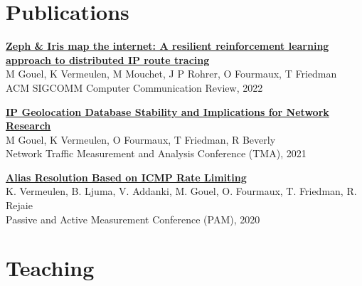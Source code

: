\documentclass[11pt,a4paper,sans]{moderncv} %
\begin{document}

\section{Publications}

\href{https://hal.archives-ouvertes.fr/hal-03597580/document}{\textbf{Zeph \& Iris map the internet: A resilient reinforcement learning approach to distributed IP route tracing}}\\
M Gouel, K Vermeulen, M Mouchet, J P Rohrer, O Fourmaux, T Friedman\\
ACM SIGCOMM Computer Communication Review, 2022

\vspace{0.25cm}
\href{https://dl.ifip.org/db/conf/tma/tma2021/tma2021-paper2.pdf}{\textbf{IP Geolocation Database Stability and Implications for Network Research}}\\
M Gouel, K Vermeulen, O Fourmaux, T Friedman, R Beverly\\
Network Traffic Measurement and Analysis Conference (TMA), 2021

\vspace{0.25cm}
\href{https://arxiv.org/pdf/2002.00252.pdf}{\textbf{Alias Resolution Based on ICMP Rate Limiting}} \\
K. Vermeulen, B. Ljuma, V. Addanki, M. Gouel, O. Fourmaux, T. Friedman, R. Rejaie\\
Passive and Active Measurement Conference (PAM), 2020


\section{Teaching}


\end{document}
